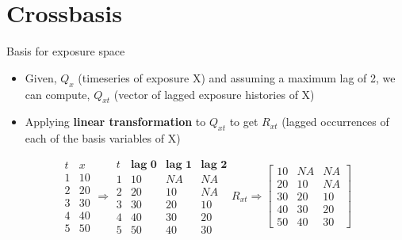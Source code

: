 \documentclass[english]{beamer}
\begin{document}
\section{Crossbasis}
\begin{frame}{Basis for exposure space}
    \begin{itemize}
        \item Given, \(Q_x\) (timeseries of exposure X) and assuming a maximum lag of 2,  we can compute, \(Q_{xt}\) (vector of lagged exposure histories of X)
        \item Applying \textbf{linear transformation} to \( Q_{xt} \) to get 
        \( R_{xt}\) (lagged occurrences of each of the basis variables of X)
    \end{itemize}
    \vspace{0.5cm}
\[
\begin{array}{c|c}
    t & {x} \\ \hline
    1 & 10  \\
    2 & 20  \\
    3 & 30  \\
    4 & 40  \\
    5 & 50  
\end{array} 
\Rightarrow 
\begin{array}{c|c|c|c}
    t & \textbf{lag 0} & \textbf{lag 1} & \textbf{lag 2} \\ \hline
    1 & 10  & NA & NA \\
    2 & 20  & 10 & NA \\
    3 & 30  & 20 & 10 \\
    4 & 40  & 30 & 20 \\
    5 & 50  & 40 & 30  
\end{array}
R_{xt}\Rightarrow  
\begin{bmatrix}
10 & NA & NA \\
20 & 10 & NA \\
30 & 20 & 10 \\
40 & 30 & 20 \\
50 & 40 & 30
\end{bmatrix}
\]
\end{frame}
\end{document}
